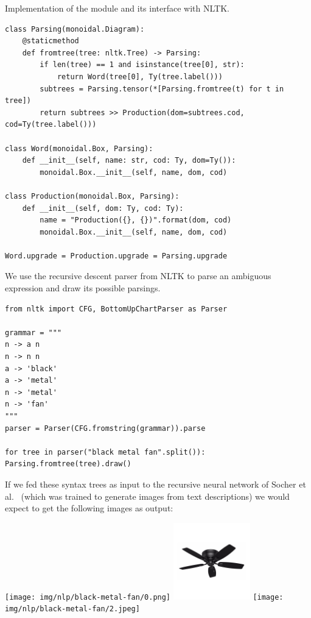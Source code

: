 \begin{python}
{\normalfont Implementation of the  module and its interface with NLTK.}

\begin{verbatim}
class Parsing(monoidal.Diagram):
    @staticmethod
    def fromtree(tree: nltk.Tree) -> Parsing:
        if len(tree) == 1 and isinstance(tree[0], str):
            return Word(tree[0], Ty(tree.label()))
        subtrees = Parsing.tensor(*[Parsing.fromtree(t) for t in tree])
        return subtrees >> Production(dom=subtrees.cod, cod=Ty(tree.label()))

class Word(monoidal.Box, Parsing):
    def __init__(self, name: str, cod: Ty, dom=Ty()):
        monoidal.Box.__init__(self, name, dom, cod)

class Production(monoidal.Box, Parsing):
    def __init__(self, dom: Ty, cod: Ty):
        name = "Production({}, {})".format(dom, cod)
        monoidal.Box.__init__(self, name, dom, cod)

Word.upgrade = Production.upgrade = Parsing.upgrade
\end{verbatim}
\end{python}

\begin{example}
We use the recursive descent parser from NLTK to parse an ambiguous expression and draw its possible parsings.

\begin{verbatim}
from nltk import CFG, BottomUpChartParser as Parser

grammar = """
n -> a n
n -> n n
a -> 'black'
a -> 'metal'
n -> 'metal'
n -> 'fan'
"""
parser = Parser(CFG.fromstring(grammar)).parse

for tree in parser("black metal fan".split()): Parsing.fromtree(tree).draw()
\end{verbatim}
\begin{center}
\hfill
{}
\hfill
{}
\end{center}
If we fed these syntax trees as input to the recursive neural network of Socher et al.~\cite{SocherEtAl11} (which was trained to generate images from text descriptions) we would expect to get the following images as output:
\begin{center}
\texttt{[image: img/nlp/black-metal-fan/0.png]}
\hfill
\includegraphics[width=0.25\textwidth]{img/nlp/black-metal-fan/1.jpeg}
\hfill
\texttt{[image: img/nlp/black-metal-fan/2.jpeg]}
\end{center}
\end{example}

